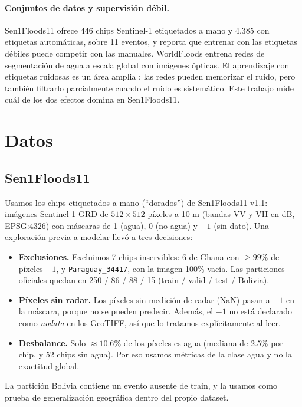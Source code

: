 \documentclass{article}
\begin{document}
\paragraph{Conjuntos de datos y supervisión débil.}
Sen1Floods11 \citep{bonafilia2020} ofrece 446 chips Sentinel-1 etiquetados a mano y 4,385 con etiquetas automáticas, sobre 11 eventos, y reporta que entrenar con las etiquetas débiles puede competir con las manuales. WorldFloods \citep{mateogarcia2021} entrena redes de segmentación de agua a escala global con imágenes ópticas. El aprendizaje con etiquetas ruidosas es un área amplia \citep{song2022}: las redes pueden memorizar el ruido, pero también filtrarlo parcialmente cuando el ruido es sistemático. Este trabajo mide cuál de los dos efectos domina en Sen1Floods11.

\section{Datos}

\subsection{Sen1Floods11}
Usamos los chips etiquetados a mano (``dorados'') de Sen1Floods11 v1.1: imágenes Sentinel-1 GRD de $512 \times 512$ píxeles a 10 m (bandas VV y VH en dB, EPSG:4326) con máscaras de 1 (agua), 0 (no agua) y $-1$ (sin dato). Una exploración previa a modelar llevó a tres decisiones:
\begin{itemize}
  \item \textbf{Exclusiones.} Excluimos 7 chips inservibles: 6 de Ghana con $\geq 99\%$ de píxeles $-1$, y \texttt{Paraguay\_34417}, con la imagen 100\% vacía. Las particiones oficiales quedan en 250 / 86 / 88 / 15 (train / valid / test / Bolivia).
  \item \textbf{Píxeles sin radar.} Los píxeles sin medición de radar (NaN) pasan a $-1$ en la máscara, porque no se pueden predecir. Además, el $-1$ no está declarado como \emph{nodata} en los GeoTIFF, así que lo tratamos explícitamente al leer.
  \item \textbf{Desbalance.} Solo $\approx 10.6\%$ de los píxeles es agua (mediana de 2.5\% por chip, y 52 chips sin agua). Por eso usamos métricas de la clase agua y no la exactitud global.
\end{itemize}
La partición Bolivia contiene un evento ausente de train, y la usamos como prueba de generalización geográfica dentro del propio dataset.
\end{document}

